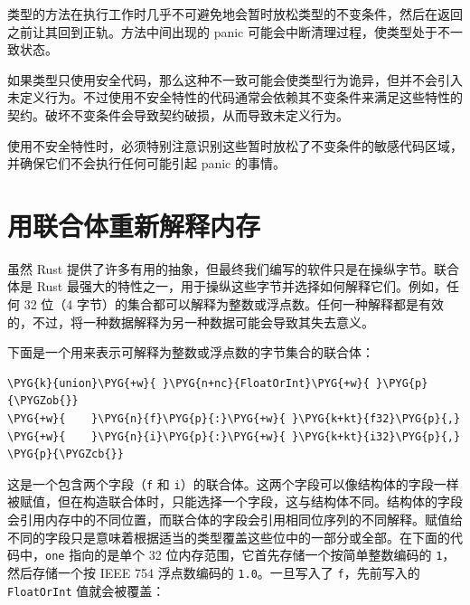类型的方法在执行工作时几乎不可避免地会暂时放松类型的不变条件，然后在返回之前让其回到正轨。方法中间出现的 panic 可能会中断清理过程，使类型处于不一致状态。

如果类型只使用安全代码，那么这种不一致可能会使类型行为诡异，但并不会引入未定义行为。不过使用不安全特性的代码通常会依赖其不变条件来满足这些特性的契约。破坏不变条件会导致契约破损，从而导致未定义行为。

使用不安全特性时，必须特别注意识别这些暂时放松了不变条件的敏感代码区域，并确保它们不会执行任何可能引起 panic 的事情。

\section{用联合体重新解释内存}

虽然 Rust 提供了许多有用的抽象，但最终我们编写的软件只是在操纵字节。联合体是 Rust 最强大的特性之一，用于操纵这些字节并选择如何解释它们。例如，任何 32 位（4 字节）的集合都可以解释为整数或浮点数。任何一种解释都是有效的，不过，将一种数据解释为另一种数据可能会导致其失去意义。

下面是一个用来表示可解释为整数或浮点数的字节集合的联合体：

\begin{Verbatim}[commandchars=\\\{\},breaklines=true,breakanywhere=true,fontsize=\codefont,xleftmargin=17bp]
\PYG{k}{union}\PYG{+w}{ }\PYG{n+nc}{FloatOrInt}\PYG{+w}{ }\PYG{p}{\PYGZob{}}
\PYG{+w}{    }\PYG{n}{f}\PYG{p}{:}\PYG{+w}{ }\PYG{k+kt}{f32}\PYG{p}{,}
\PYG{+w}{    }\PYG{n}{i}\PYG{p}{:}\PYG{+w}{ }\PYG{k+kt}{i32}\PYG{p}{,}
\PYG{p}{\PYGZcb{}}
\end{Verbatim}

这是一个包含两个字段（\texttt{f} 和 \texttt{i}）的联合体。这两个字段可以像结构体的字段一样被赋值，但在构造联合体时，只能选择一个字段，这与结构体不同。结构体的字段会引用内存中的不同位置，而联合体的字段会引用相同位序列的不同解释。赋值给不同的字段只是意味着根据适当的类型覆盖这些位中的一部分或全部。在下面的代码中，\texttt{one} 指向的是单个 32 位内存范围，它首先存储一个按简单整数编码的 \texttt{1}，然后存储一个按 IEEE 754 浮点数编码的 \texttt{1.0}。一旦写入了 \texttt{f}，先前写入的 \texttt{FloatOrInt} 值就会被覆盖：


